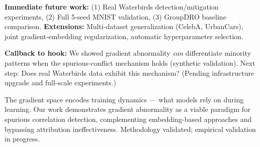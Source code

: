 \textbf{Immediate future work:} (1) Real Waterbirds detection/mitigation experiments, (2) Full 5-seed MNIST validation, (3) GroupDRO baseline comparison. \textbf{Extensions:} Multi-dataset generalization (CelebA, UrbanCars), joint gradient-embedding regularization, automatic hyperparameter selection.

\textbf{Callback to hook:} We showed gradient abnormality \emph{can} differentiate minority patterns when the spurious-conflict mechanism holds (synthetic validation). Next step: Does real Waterbirds data exhibit this mechanism? (Pending infrastructure upgrade and full-scale experiments.)

The gradient space encodes training dynamics --- what models rely on during learning. Our work demonstrates gradient abnormality as a viable paradigm for spurious correlation detection, complementing embedding-based approaches and bypassing attribution ineffectiveness. Methodology validated; empirical validation in progress.
